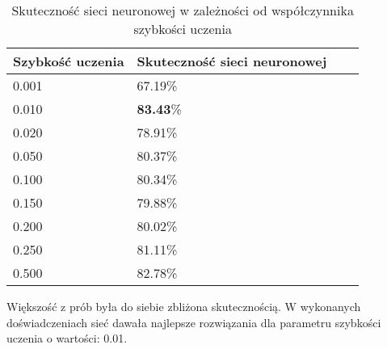 \documentclass[a4paper,12pt,twoside,openany]{report}
\begin{document}
	\begin{table}[H]
		\centering
		\begin{tabularx}{\textwidth}{|X|X|X|X|}
			\hline
			\textbf{Szybkość uczenia} & \textbf{Skuteczność sieci neuronowej}    \\ 
			
			\hline
			0.001 & 67.19\% \\ 
			
			\hline
			0.010 & \textbf{83.43}\% \\
			
			\hline
			0.020 & 78.91\% \\
			
			\hline
			0.050 & 80.37\% \\
			
			\hline
			0.100 & 80.34\% \\
			
			\hline
			0.150 & 79.88\% \\
			
			\hline
			0.200 & 80.02\% \\
			
			\hline
			0.250 & 81.11\% \\
			
			\hline
			0.500 & 82.78\% \\
			\hline
		\end{tabularx}
		
		\caption{Skuteczność sieci neuronowej w zależności od współczynnika szybkości uczenia}
	\end{table}

	Większość z prób była do siebie zbliżona skutecznością. W wykonanych doświadczeniach sieć dawała najlepsze rozwiązania dla parametru szybkości uczenia o wartości: 0.01.
	
\end{document}
